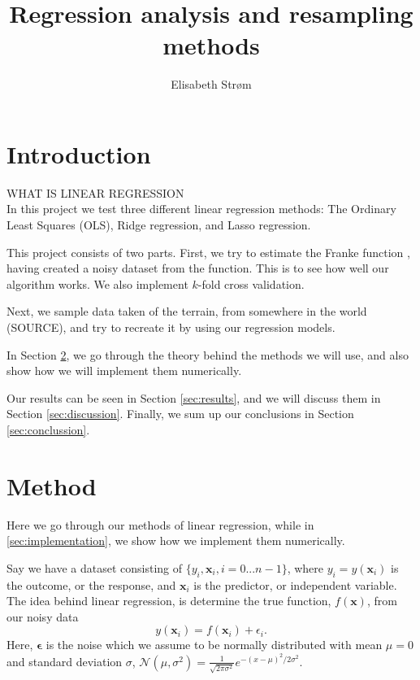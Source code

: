 \documentclass[a4paper,10pt,english]{article}
\title{Regression analysis and resampling methods}
\author{Elisabeth Strøm}
\begin{document}
\maketitle

\pagebreak

\tableofcontents

\pagebreak


\section{Introduction}
WHAT IS LINEAR REGRESSION\\

In this project we test three different linear regression methods: The Ordinary Least Squares (OLS), Ridge regression, and Lasso regression.

This project consists of two parts.
First, we try to estimate the Franke function \citep{Franke}, having created a noisy dataset from the function. This is to see how well our algorithm works. We also implement $k$-fold cross validation.

Next, we sample data taken of the terrain, from somewhere in the world (SOURCE), and try to recreate it by using our regression models.

In Section \ref{sec:method}, we go through the theory behind the methods we will use, and also show how we will implement them numerically.

Our results can be seen in Section \ref{sec:results}, and we will discuss them in Section \ref{sec:discussion}. Finally, we sum up our conclusions in Section \ref{sec:conclussion}.

%
%
\section{Method}\label{sec:method}
Here we go through our methods of linear regression, while in \ref{sec:implementation}, we show how we implement them numerically.

Say we have a dataset consisting of $\{y_i, \bm{{x}}_i, i=0...n-1\}$, where $y_i=y(\bm{{x}}_i)$ is the outcome, or the response, and $\bm{{x}}_i$ is the predictor, or independent variable.
The idea behind linear regression, is determine the true function, $f(\bm{{x}})$, from our noisy data 
\begin{equation}
y(\bm{{x}}_i)=f(\bm{{x}}_i) + \epsilon_i.
\end{equation}
Here, $\bm{{\epsilon}}$ is the noise which we assume to be normally distributed with mean $\mu=0$ and standard deviation $\sigma$, $\mathcal{N}(\mu,\sigma^2)=\frac{1}{\sqrt{2 \pi \sigma^{2}}} e^{-(x-\mu)^{2} / 2 \sigma^{2}}$.
\end{document}
